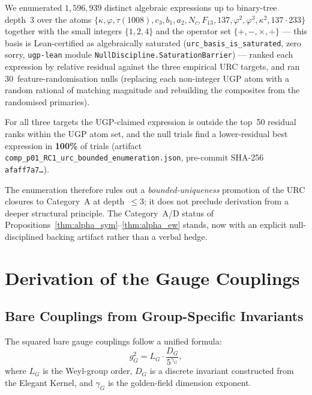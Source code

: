 \documentclass[11pt]{article}
\theoremstyle{remark}
\begin{document}
\smallskip
We enumerated $1{,}596{,}939$ distinct algebraic expressions up to binary-tree depth~3 over the atoms $\{\kappa, \varphi, \tau(1008), c_3, b_1, a_2, N_c, F_{13}, 137, \varphi^2, \varphi^3, \kappa^2, 137\cdot 233\}$ together with the small integers $\{1,2,4\}$ and the operator set $\{+,-,\times,\div\}$ — this basis is Lean-certified as algebraically saturated (\texttt{urc\_basis\_is\_saturated}, zero sorry, \texttt{ugp-lean} module \texttt{NullDiscipline.SaturationBarrier}) — ranked each expression by relative residual against the three empirical URC targets, and ran 30~feature-randomisation nulls (replacing each non-integer UGP atom with a random rational of matching magnitude and rebuilding the composites from the randomised primaries).

\smallskip
For all three targets the UGP-claimed expression is outside the top~50 residual ranks within the UGP atom set, and the null trials find a lower-residual best expression in \textbf{100\%} of trials (artifact \texttt{comp\_p01\_RC1\_urc\_bounded\_enumeration.json}, pre-commit SHA-256 \texttt{afaff7a7\ldots}).

\smallskip
The enumeration therefore rules out a \emph{bounded-uniqueness} promotion of the URC closures to Category~A at depth~$\le 3$; it does not preclude derivation from a deeper structural principle.  The Category~A/D status of Propositions~\ref{thm:alpha_sym}--\ref{thm:alpha_ew} stands, now with an explicit null-disciplined backing artifact rather than a verbal hedge.


\section{Derivation of the Gauge Couplings}
\label{sec:gauge}

\subsection{Bare Couplings from Group-Specific Invariants}

The squared bare gauge couplings follow a unified formula:
\begin{equation}
g_G^2 = L_G \cdot \frac{D_G}{5^{\gamma_G}},
\label{eq:gauge_master}
\end{equation}
where $L_G$ is the Weyl-group order, $D_G$ is a discrete invariant constructed from the Elegant Kernel, and $\gamma_G$ is the golden-field dimension exponent.
\end{document}
